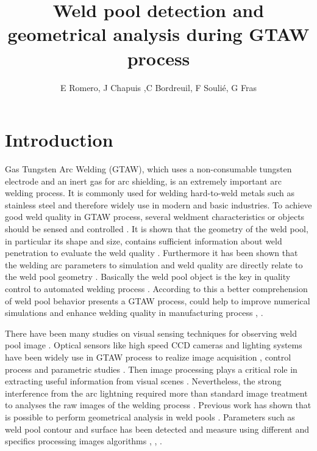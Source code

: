 \title{ Weld pool detection and geometrical analysis during GTAW process}


\author{E Romero, J Chapuis ,C Bordreuil, F Souli\'e, G Fras}

\address{Laboratoire de Mécanique et Génie Civil,
CC048, Place Eugène Bataillon, Université Montpellier 2,
34095 Montpellier, France}

\section{Introduction}

Gas Tungsten Arc Welding (GTAW), which uses a non-consumable tungsten 
electrode and an inert gas for arc shielding, is an extremely 
important arc welding process. It is commonly used for welding hard-to-weld
 metals such as stainless steel \cite{JUANG} and therefore widely use in 
modern and basic industries. To achieve good weld quality in GTAW process,
 several weldment characteristics or objects should be sensed and
 controlled \cite{DOUMANIDIS}. It is shown that the geometry of the weld 
pool, in particular its shape and size, contains sufficient information
 about weld penetration to evaluate the weld quality \cite{ZHANG}.
 Furthermore it has been shown that the welding arc parameters to 
simulation and weld quality are directly relate to the weld pool 
geometry \cite{LU}.
Basically the weld pool object is the key in quality control 
to automated welding process \cite{KOVACEVIC}. 
According to this a better comprehension of weld pool behavior
 presents a GTAW process, could help to improve numerical 
simulations and enhance welding quality in manufacturing 
process \cite{LIN}, \cite{WU1}. 

There have been many studies on visual sensing techniques
 for observing weld pool image \cite{BAE}. Optical sensors
 like high speed CCD cameras and lighting systems have been
 widely use in GTAW process to realize image acquisition 
\cite{GUANGJUN}, control process \cite{BAE} and parametric 
studies \cite{BALSAMO}. Then image processing plays a critical
 role in extracting useful information from visual scenes 
\cite{WANG}. Nevertheless, the strong interference from the
 arc lightning required more than standard image treatment
 to analyses the raw images of the welding process 
\cite{NORDBRUCH}. Previous work has shown that is possible
 to perform geometrical analysis in weld pools \cite{WU1}.
 Parameters such as weld pool contour and surface has been
 detected and measure using different and specifics processing 
images algorithms \cite{KOVACEVIC}, \cite{WU1}, \cite{SAEED}.

